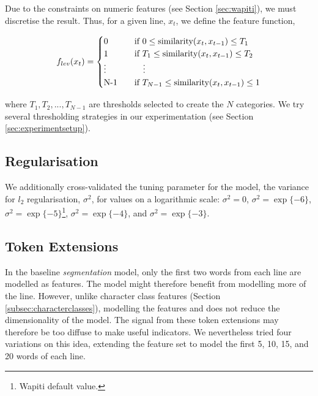 Due to the constraints on numeric features (see Section \ref{sec:wapiti}), we must discretise the result. Thus, for a given line, $x_t$, we define the feature function, 

\begin{equation}
  f_{lev}(x_t) =
  \begin{cases}
  	0 & \quad \text{if } 0 \leq \text{similarity}(x_t, x_{t-1}) \leq T_1 \\
	1 & \quad \text{if } T_1 \leq \text{similarity}(x_t, x_{t-1}) \leq T_2\\
	\vdots & \qquad \vdots \\
	$N-1$ & \quad \text{if } T_{N-1} \leq \text{similarity}(x_t, x_{t-1}) \leq 1 \\
  \end{cases}
\label{eq:levenshteinfunction}
\end{equation}

where $T_1, T_2, ..., T_{N-1}$ are thresholds selected to create the $N$ categories. We try several thresholding strategies in our experimentation (see Section \ref{sec:experimentsetup}).

\subsection{Regularisation}

We additionally cross-validated the tuning parameter for the model, the variance for $l_2$ regularisation, $\sigma^2$, for values on a logarithmic scale: $\sigma^2 = 0$, $\sigma^2 = \exp\{-6\}$, $\sigma^2 = \exp\{-5\}$\footnote{Wapiti default value.}, $\sigma^2 = \exp\{-4\}$, and $\sigma^2 = \exp\{-3\}$.

\subsection{Token Extensions}

In the baseline \emph{segmentation} model, only the first two words from each line are modelled as features. The model might therefore benefit from modelling more of the line. However, unlike character class features (Section \ref{subsec:characterclasses}), modelling the features and does not reduce the dimensionality of the model. The signal from these token extensions may therefore be too diffuse to make useful indicators. We nevertheless tried four variations on this idea, extending the feature set to model the first 5, 10, 15, and 20 words of each line.

